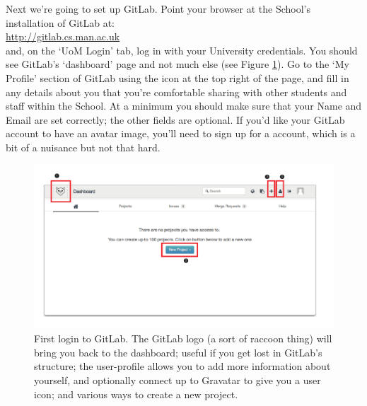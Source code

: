 Next we're going to set up GitLab. Point your browser at the School's installation of GitLab at:
\\
\url{http://gitlab.cs.man.ac.uk}
\\
and, on the `UoM Login' tab, log in with your University credentials. You should see GitLab's `dashboard' page and not much else (see Figure \ref{figure:GitLab-first-login}). Go to the `My Profile' section of GitLab using the icon at the top right of the page, and fill in any details about you that you're comfortable sharing with other students and staff within the School. At a minimum you should make sure that your Name and Email are set correctly; the other fields are optional. If you'd like your GitLab account to have an avatar image, you'll need to sign up for a  account, which is a bit of a nuisance but not that hard.

\begin{figure}
\centerline{\includegraphics[width=15cm]{images/GitLab-first-login}}
\caption{First login to GitLab. \protect{} The GitLab logo (a sort of raccoon thing) will bring you back to the dashboard; useful if you get lost in GitLab's structure; \protect{} the user-profile allows you to add more information about yourself, and optionally connect up to Gravatar to give you a user icon; and \protect{} various ways to create a new project.}\label{figure:GitLab-first-login}
\end{figure}


